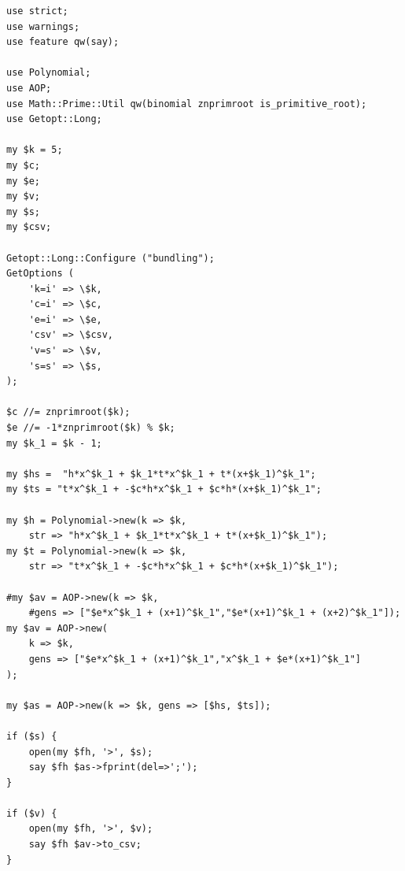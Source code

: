 \documentclass[bibliography=totoc, a4paper, 12pt]{extarticle}
\begin{document}
\begin{verbatim}
use strict;
use warnings;
use feature qw(say);

use Polynomial;
use AOP;
use Math::Prime::Util qw(binomial znprimroot is_primitive_root);
use Getopt::Long;

my $k = 5;
my $c;
my $e;
my $v;
my $s;
my $csv;

Getopt::Long::Configure ("bundling");
GetOptions (
    'k=i' => \$k,
    'c=i' => \$c,
    'e=i' => \$e,
    'csv' => \$csv,
    'v=s' => \$v,
    's=s' => \$s,
);

$c //= znprimroot($k);
$e //= -1*znprimroot($k) % $k;
my $k_1 = $k - 1;

my $hs =  "h*x^$k_1 + $k_1*t*x^$k_1 + t*(x+$k_1)^$k_1";
my $ts = "t*x^$k_1 + -$c*h*x^$k_1 + $c*h*(x+$k_1)^$k_1";

my $h = Polynomial->new(k => $k,
    str => "h*x^$k_1 + $k_1*t*x^$k_1 + t*(x+$k_1)^$k_1");
my $t = Polynomial->new(k => $k,
    str => "t*x^$k_1 + -$c*h*x^$k_1 + $c*h*(x+$k_1)^$k_1");

#my $av = AOP->new(k => $k,
    #gens => ["$e*x^$k_1 + (x+1)^$k_1","$e*(x+1)^$k_1 + (x+2)^$k_1"]);
my $av = AOP->new(
    k => $k,
    gens => ["$e*x^$k_1 + (x+1)^$k_1","x^$k_1 + $e*(x+1)^$k_1"]
);

my $as = AOP->new(k => $k, gens => [$hs, $ts]);

if ($s) {
    open(my $fh, '>', $s);
    say $fh $as->fprint(del=>';');
}

if ($v) {
    open(my $fh, '>', $v);
    say $fh $av->to_csv;
}
\end{verbatim}

\makeatletter
\renewcommand*{\@biblabel}[1]{\hfill#1.}
\makeatother
\end{document}
